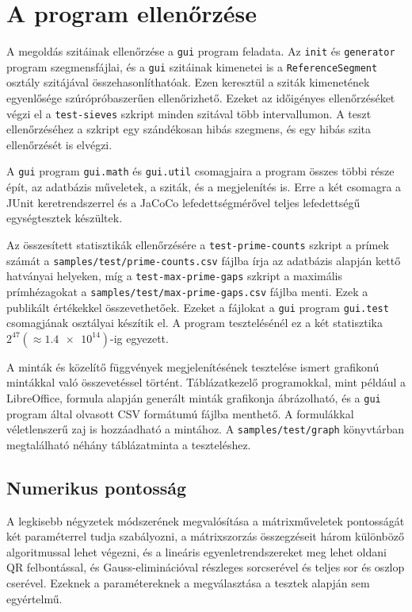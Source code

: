 \pagebreak
\section{A program ellenőrzése}

A megoldás szitáinak ellenőrzése a \texttt{gui} program feladata.
Az \texttt{init} és \texttt{generator} program szegmensfájlai, és a \texttt{gui} szitáinak kimenetei is a \texttt{ReferenceSegment} osztály szitájával összehasonlíthatóak.
Ezen keresztül a sziták kimenetének egyenlősége szúrópróbaszerűen ellenőrizhető.
Ezeket az időigényes ellenőrzéséket végzi el a \texttt{test-sieves} szkript minden szitával több intervallumon.
A teszt ellenőrzéséhez a szkript egy szándékosan hibás szegmens, és egy hibás szita ellenőrzését is elvégzi.

A \texttt{gui} program \texttt{gui.math} és \texttt{gui.util} csomagjaira a program összes többi része épít, az adatbázis műveletek, a sziták, és a megjelenítés is. Erre a két csomagra a \mbox{JUnit} keretrendszerrel és a JaCoCo lefedettségmérővel teljes lefedettségű egységtesztek készültek.

Az összesített statisztikák ellenőrzésére a \texttt{test-prime-counts} szkript a prímek számát a \texttt{samples/test/prime-counts.csv} fájlba írja az adatbázis alapján kettő hatványai helyeken, míg a \texttt{test-max-prime-gaps} szkript a maximális prímhézagokat a \texttt{samples/test/max-prime-gaps.csv} fájlba menti.
Ezek a publikált értékekkel\cite{gaps}\cite{pi} összevethetőek.
Ezeket a fájlokat a \texttt{gui} program \texttt{gui.test} csomagjának osztályai készítik el.
A program tesztelésénél ez a két statisztika $2^{47}(\approx \num{1,4e14})$-ig egyezett.

A minták és közelítő függvények megjelenítésének tesztelése ismert grafikonú mintákkal való összevetéssel történt.
Táblázatkezelő programokkal, mint például a LibreOffice, formula alapján generált minták grafikonja ábrázolható, és a \texttt{gui} program által olvasott CSV formátumú fájlba menthető.
A formulákkal véletlenszerű zaj is hozzáadható a mintához.
A \texttt{samples/test/graph} könyvtárban megtalálható néhány táblázatminta a teszteléshez.

\subsection{Numerikus pontosság}

A legkisebb négyzetek módszerének megvalósítása a mátrixműveletek pontosságát két paraméterrel tudja szabályozni, a mátrixszorzás összegzéseit három különböző algoritmussal lehet végezni, és a lineáris egyenletrendszereket meg lehet oldani QR felbontással, és Gauss-eliminációval részleges sorcserével és teljes sor és oszlop cserével.
Ezeknek a paramétereknek a megválasztása a tesztek alapján sem egyértelmű.

